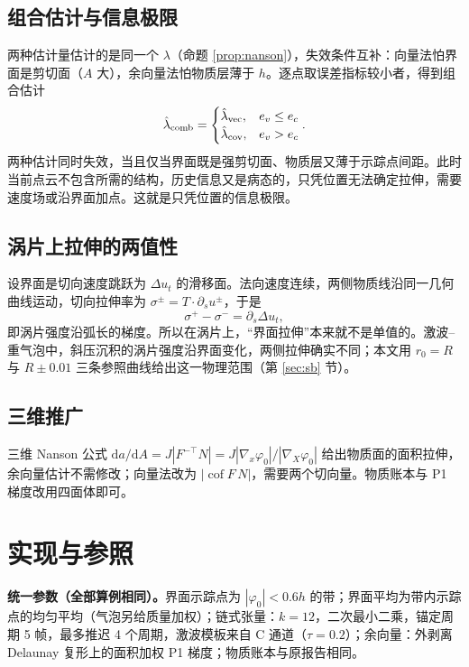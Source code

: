\documentclass[10.5pt,a4paper]{article}
\theoremstyle{plain}
\newcommand{\dd}{\mathrm{d}}
\begin{document}
\subsection{组合估计与信息极限}
两种估计量估计的是同一个 $\lambda$（命题 \ref{prop:nanson}），失效条件互补：向量法怕界面是剪切面（$A$ 大），余向量法怕物质层薄于 $h$。逐点取误差指标较小者，得到组合估计
\begin{equation}
\hat\lambda_{\rm comb}=\begin{cases}\hat\lambda_{\rm vec},& e_v\le e_c\\ \hat\lambda_{\rm cov},& e_v>e_c\end{cases}.
\end{equation}
两种估计同时失效，当且仅当界面既是强剪切面、物质层又薄于示踪点间距。此时当前点云不包含所需的结构，历史信息又是病态的，只凭位置无法确定拉伸，需要速度场或沿界面加点。这就是只凭位置的信息极限。

\subsection{涡片上拉伸的两值性}
设界面是切向速度跳跃为 $\Delta u_t$ 的滑移面。法向速度连续，两侧物质线沿同一几何曲线运动，切向拉伸率为 $\sigma^\pm=T\cdot\partial_s u^\pm$，于是
\begin{equation}
\sigma^+-\sigma^-=\partial_s\Delta u_t ,
\end{equation}
即涡片强度沿弧长的梯度。所以在涡片上，“界面拉伸”本来就不是单值的。激波–重气泡中，斜压沉积的涡片强度沿界面变化，两侧拉伸确实不同；本文用 $r_0=R$ 与 $R\pm0.01$ 三条参照曲线给出这一物理范围（第 \ref{sec:sb} 节）。

\subsection{三维推广}
三维 Nanson 公式 $\dd a/\dd A=J|F^{-\top}N|=J|\nabla_x\varphi_0|/|\nabla_X\varphi_0|$ 给出物质面的面积拉伸，余向量估计不需修改；向量法改为 $|\operatorname{cof}F\,N|$，需要两个切向量。物质账本与 P1 梯度改用四面体即可。

\section{实现与参照}

\textbf{统一参数（全部算例相同）。}界面示踪点为 $|\varphi_0|<0.6h$ 的带；界面平均为带内示踪点的均匀平均（气泡另给质量加权）；链式张量：$k=12$，二次最小二乘，锚定周期 5 帧，最多推迟 4 个周期，激波模板来自 C 通道（$\tau=0.2$）；余向量：外剥离 Delaunay 复形上的面积加权 P1 梯度；物质账本与原报告相同。
\end{document}
